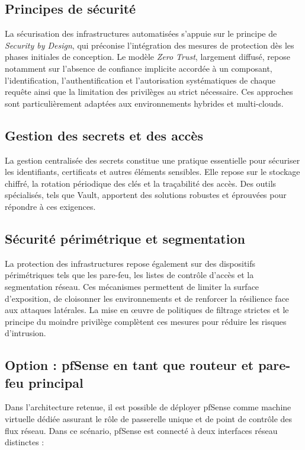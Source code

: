 \subsection{Principes de sécurité}

La sécurisation des infrastructures automatisées s’appuie sur le principe de \emph{Security by Design}, qui préconise l’intégration des mesures de protection dès les phases initiales de conception. Le modèle \emph{Zero Trust}, largement diffusé, repose notamment sur l’absence de confiance implicite accordée à un composant, l'identification, l’authentification et l’autorisation systématiques de chaque requête ainsi que la limitation des privilèges au strict nécessaire. Ces approches sont particulièrement adaptées aux environnements hybrides et multi-clouds.

\subsection{Gestion des secrets et des accès}

La gestion centralisée des secrets constitue une pratique essentielle pour sécuriser les identifiants, certificats et autres éléments sensibles. Elle repose sur le stockage chiffré, la rotation périodique des clés et la traçabilité des accès. Des outils spécialisés, tels que Vault, apportent des solutions robustes et éprouvées pour répondre à ces exigences.

\subsection{Sécurité périmétrique et segmentation}

La protection des infrastructures repose également sur des dispositifs périmétriques tels que les pare-feu, les listes de contrôle d’accès et la segmentation réseau. Ces mécanismes permettent de limiter la surface d’exposition, de cloisonner les environnements et de renforcer la résilience face aux attaques latérales. La mise en œuvre de politiques de filtrage strictes et le principe du moindre privilège complètent ces mesures pour réduire les risques d’intrusion.

\subsection{Option : pfSense en tant que routeur et pare-feu principal}

Dans l’architecture retenue, il est possible de déployer pfSense comme machine virtuelle dédiée assurant le rôle de passerelle unique et de point de contrôle des flux réseau. Dans ce scénario, pfSense est connecté à deux interfaces réseau distinctes :

